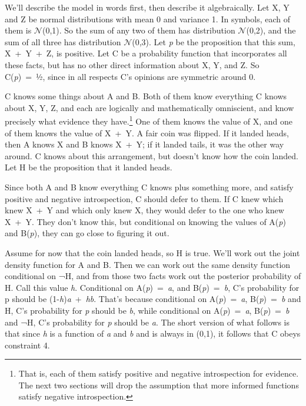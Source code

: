 \documentclass[
  10pt,
  letterpaper,
  DIV=11,
  numbers=noendperiod,
  twoside]{scrartcl}
\begin{document}
We'll describe the model in words first, then describe it algebraically.
Let X, Y and Z be normal distributions with mean 0 and variance 1. In
symbols, each of them is \(\mathcal{N}\)(0,1). So the sum of any two of
them has distribution \(\mathcal{N}\)(0,2), and the sum of all three has
distribution \(\mathcal{N}\)(0,3). Let \emph{p} be the proposition that
this sum, X~+~Y~+~Z, is positive. Let C be a probability function that
incorporates all these facts, but has no other direct information about
X, Y, and Z. So C(\emph{p})~=~½, since in all respects C's opinions are
symmetric around 0.

C knows some things about A and B. Both of them know everything C knows
about X, Y, Z, and each are logically and mathematically omniscient, and
know precisely what evidence they have.\footnote{That is, each of them
  satisfy positive and negative introspection for evidence. The next two
  sections will drop the assumption that more informed functions satisfy
  negative introspection.} One of them knows the value of X, and one of
them knows the value of X~+~Y. A fair coin was flipped. If it landed
heads, then A knows X and B knows X~+~Y; if it landed tails, it was the
other way around. C knows about this arrangement, but doesn't know how
the coin landed. Let H be the proposition that it landed heads.

Since both A and B know everything C knows plus something more, and
satisfy positive and negative introspection, C should defer to them. If
C knew which knew X~+~Y and which only knew X, they would defer to the
one who knew X~+~Y. They don't know this, but conditional on knowing the
values of A(\emph{p}) and B(\emph{p}), they can go close to figuring it
out.

Assume for now that the coin landed heads, so H is true. We'll work out
the joint density function for A and B. Then we can work out the same
density function conditional on ¬H, and from those two facts work out
the posterior probability of H. Call this value \emph{h}. Conditional on
A(\emph{p})~=~\emph{a}, and B(\emph{p})~=~\emph{b}, C's probability for
p should be (1-\emph{h})\emph{a}~+~\emph{hb}. That's because conditional
on A(\emph{p})~=~\emph{a}, B(\emph{p})~=~\emph{b} and H, C's probability
for \emph{p} should be \emph{b}, while conditional on
A(\emph{p})~=~\emph{a}, B(\emph{p})~=~\emph{b} and ¬H, C's probability
for \emph{p} should be \emph{a}. The short version of what follows is
that since \emph{h} is a function of \emph{a} and \emph{b} and is always
in (0,1), it follows that C obeys constraint 4.
\end{document}
